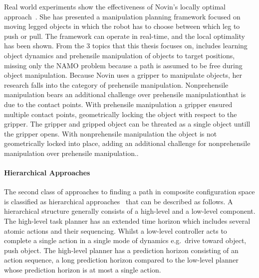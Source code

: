 Real world experiments show the effectiveness of Novin's locally optimal approach~\cite{sabbaghnovin_model_2021}. She has presented a manipulation planning framework focused on moving legged objects in which the robot has to choose between which leg to push or pull. The framework can operate in real-time, and the local optimality has been shown. From the 3 topics that this thesis focuses on, \citeauthor{sabbaghnovin_model_2021} includes learning object dynamics and prehensile manipulation of objects to target positions, missing only the \ac{NAMO} problem because a path is assumed to be free during object manipulation. Because Novin uses a gripper to manipulate objects, her research falls into the category of prehensile manipulation. Nonprehensile manipulation bears an additional challenge over prehensile manipulationthat is due to the contact points. With prehensile manipulation a gripper ensured multiple contact points, geometrically locking the object with respect to the gripper. The gripper and gripped object can be threated as a single object untill the gripper opens. With nonprehensile manipulation the object is not geometrically locked into place, adding an additional challenge for nonprehensile manipulation over prehensile manipulation.\bs.

\paragraph{Hierarchical Approaches}
The second class of approaches to finding a path in composite configuration space is classified as hierarchical approaches~\cite{ellis_navigation_2022,krontiris_dealing_2015,scholz_navigation_2016,vega-brown_asymptotically_2020,wang_affordancebased_2020} that can be described as follows. A hierarchical structure generally consists of a high-level and a low-level component. The high-level task planner has an extended time horizon which includes several atomic actions and their sequencing. Whilst a low-level controller acts to complete a single action in a single mode of dynamics e.g.~drive toward object, push object. The high-level planner has a prediction horizon consisting of an action sequence, a long prediction horizon compared to the low-level planner whose prediction horizon is at most a single action.\bs

